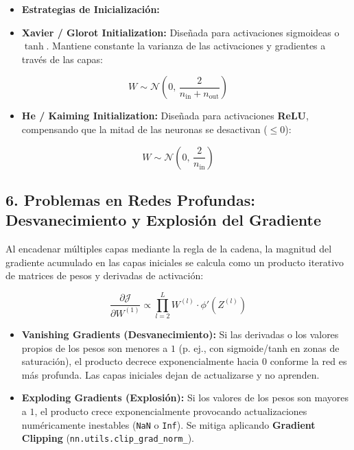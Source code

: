\documentclass[11pt,oneside]{article}
\begin{document}
\begin{itemize}

\item \textbf{Estrategias de Inicialización:}

\item \textbf{Xavier / Glorot Initialization:} Diseñada para activaciones sigmoideas o \(\tanh\). Mantiene constante la varianza de las activaciones y gradientes a través de las capas:

\end{itemize}

\[W \sim \mathcal{N}\left(0, \, \frac{2}{n_{\text{in}} + n_{\text{out}}}\right)\]

\begin{itemize}

\item \textbf{He / Kaiming Initialization:} Diseñada para activaciones \textbf{ReLU}, compensando que la mitad de las neuronas se desactivan (\(\le 0\)):

\end{itemize}

\[W \sim \mathcal{N}\left(0, \, \frac{2}{n_{\text{in}}}\right)\]

\subsection{6. Problemas en Redes Profundas: Desvanecimiento y Explosión del Gradiente}

Al encadenar múltiples capas mediante la regla de la cadena, la magnitud del gradiente acumulado en las capas iniciales se calcula como un producto iterativo de matrices de pesos y derivadas de activación:

\[\frac{\partial \mathcal{J}}{\partial W^{(1)}} \propto \prod_{l=2}^{L} W^{(l)} \cdot \phi'(Z^{(l)})\]

\begin{itemize}

\item \textbf{Vanishing Gradients (Desvanecimiento):} Si las derivadas o los valores propios de los pesos son menores a \(1\) (p. ej., con sigmoide/tanh en zonas de saturación), el producto decrece exponencialmente hacia \(0\) conforme la red es más profunda. Las capas iniciales dejan de actualizarse y no aprenden.

\end{itemize}

\begin{itemize}

\item \textbf{Exploding Gradients (Explosión):} Si los valores de los pesos son mayores a \(1\), el producto crece exponencialmente provocando actualizaciones numéricamente inestables (\texttt{NaN} o \texttt{Inf}). Se mitiga aplicando \textbf{Gradient Clipping} (\texttt{nn.utils.clip\_grad\_norm\_}).

\end{itemize}
\end{document}
